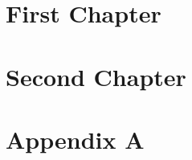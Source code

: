 \documentclass{report}
\begin{document}
\chapter{First Chapter}

\chapter{Second Chapter}

\appendix
\chapter{Appendix A}


\printbibliography
\end{document}
